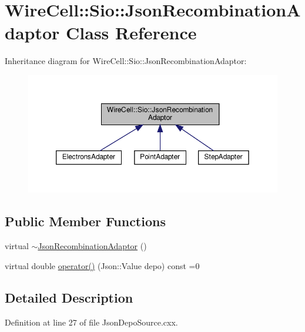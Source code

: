\hypertarget{class_sio_1_1_json_recombination_adaptor}{}\section{Wire\+Cell\+:\+:Sio\+:\+:Json\+Recombination\+Adaptor Class Reference}
\label{class_sio_1_1_json_recombination_adaptor}


Inheritance diagram for Wire\+Cell\+:\+:Sio\+:\+:Json\+Recombination\+Adaptor\+:
\nopagebreak
\begin{figure}[H]
\begin{center}
\leavevmode
\includegraphics[width=350pt]{class_sio_1_1_json_recombination_adaptor__inherit__graph}
\end{center}
\end{figure}
\subsection*{Public Member Functions}
\begin{DoxyCompactItemize}
\item 
virtual \hyperlink{class_sio_1_1_json_recombination_adaptor_ab17bfef9d1488c1ceccfc2c3564b6f2a}{$\sim$\+Json\+Recombination\+Adaptor} ()
\item 
virtual double \hyperlink{class_sio_1_1_json_recombination_adaptor_abb1bebe500df507e3e9662e0026b7025}{operator()} (Json\+::\+Value depo) const =0
\end{DoxyCompactItemize}


\subsection{Detailed Description}


Definition at line 27 of file Json\+Depo\+Source.\+cxx.



